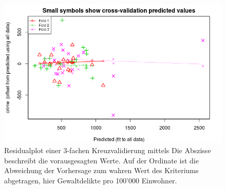 \begin{figure}[hbtp]
\centering
\includegraphics[width=\textwidth]{cvlm.png}
\caption{Residualplot einer 3-fachen Kreuzvalidierung mittels  Die Abszisse beschreibt die vorausgesagten Werte. Auf der Ordinate ist die Abweichung der Vorhersage zum wahren Wert des Kriteriums abgetragen, hier Gewaltdelikte pro 100'000 Einwohner.}
\label{plot:cvlm}
\end{figure}